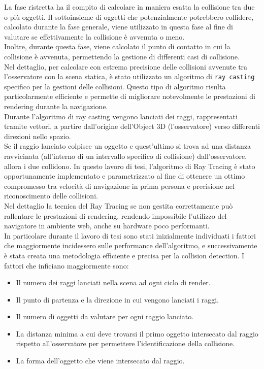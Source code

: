 La fase ristretta ha il compito di calcolare in maniera esatta la collisione tra due o più oggetti. Il sottoinsieme di oggetti che potenzialmente potrebbero collidere, calcolato durante la fase generale, viene utilizzato in questa fase  al fine di valutare se effettivamente la collisione è avvenuta o meno.
\\
Inoltre, durante questa fase, viene calcolato il punto di contatto in cui la collisione è avvenuta, permettendo la gestione di differenti casi di collisione.
\\
Nel dettaglio, per calcolare con estrema precisione delle collisioni avvenute tra l’osservatore con la scena statica, è stato utilizzato un algoritmo di \texttt{ray casting} specifico per la gestioni delle collisioni.
Questo tipo di algoritmo risulta particolarmente efficiente e permette di migliorare notevolmente le prestazioni di rendering durante la navigazione.
\\
Durante l’algoritmo di ray casting vengono lanciati dei raggi, rappresentati tramite vettori, a partire dall’origine dell’Object 3D (l’osservatore) verso differenti direzioni nello spazio.
\\
Se il raggio lanciato colpisce un oggetto e quest’ultimo si trova ad una distanza ravvicinata (all’interno di un intervallo specifico di collisione) dall’osservatore, allora i due collidono.
In questo lavoro di tesi, l’algoritmo di Ray Tracing è stato opportunamente implementato e parametrizzato al fine di ottenere un ottimo compromesso tra velocità di navigazione in prima persona  e precisione nel riconoscimento delle collisioni.
\\
Nel dettaglio la tecnica del Ray Tracing se non gestita correttamente può rallentare le prestazioni di rendering, rendendo impossibile l’utilizzo del navigatore in ambiente web, anche su hardware poco performanti.
\\
In particolare durante il lavoro di tesi sono stati inizialmente individuati i fattori che maggiormente incidessero sulle performance dell’algoritmo, e successivamente è stata creata una metodologia efficiente e precisa per la collision detection.
I fattori che inficiano maggiormente sono:
\begin{itemize}
\item Il numero dei raggi lanciati nella scena ad ogni ciclo di render.
\item Il punto di partenza e la direzione in cui vengono lanciati i raggi.
\item Il numero di oggetti da valutare per ogni raggio lanciato.
\item La distanza minima a cui deve trovarsi il primo oggetto intersecato dal raggio rispetto all’osservatore per permettere l’identificazione della collisione.
\item La forma dell’oggetto che viene intersecato dal raggio.
\end{itemize}

